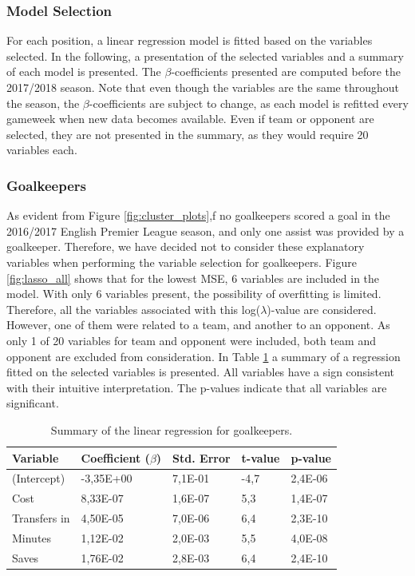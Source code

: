 \subsubsection{Model Selection}
For each position, a linear regression model is fitted based on the variables selected. In the following, a presentation of the selected variables and a summary of each model is presented. The $\beta$-coefficients presented are computed before the 2017/2018 season. Note that even though the variables are the same throughout the season, the $\beta$-coefficients are subject to change, as each model is refitted every gameweek when new data becomes available. Even if team or opponent are selected, they are not presented in the summary, as they would require 20 variables each.

\newpar

\subsubsection{Goalkeepers}

As evident from Figure \ref{fig:cluster_plots},f no goalkeepers scored a goal in the 2016/2017 English Premier League season, and only one assist was provided by a goalkeeper. Therefore, we have decided not to consider these explanatory variables when performing the variable selection for goalkeepers. Figure \ref{fig:lasso_all} shows that for the lowest MSE, 6 variables are included in the model. With only 6 variables present, the possibility of overfitting is limited. Therefore, all the variables associated with this log($\lambda$)-value are considered. However, one of them were related to a team, and another to an opponent. As only 1 of 20 variables for team and opponent were included, both team and opponent are excluded from consideration. In Table \ref{tab:coef_GLK} a summary of a regression fitted on the selected variables is presented. All variables have a sign consistent with their intuitive interpretation. The p-values indicate that all variables are significant. 

\begin{table}[H]
\centering
\begin{tabular}{|l|l|l|l|l|}
\hline
Variable     & Coefficient ($\beta$) & Std. Error & t-value & p-value \\ \hline
(Intercept)  & -3,35E+00    & 7,1E-01    & -4,7    & 2,4E-06               \\
Cost         & 8,33E-07 & 1,6E-07    & 5,3     & 1,4E-07               \\
Transfers in & 4,50E-05 & 7,0E-06    & 6,4     & 2,3E-10               \\
Minutes      & 1,12E-02 & 2,0E-03    & 5,5     & 4,0E-08               \\
Saves        & 1,76E-02 & 2,8E-03    & 6,4     & 2,4E-10
\\
\hline
\end{tabular}
\caption{Summary of the linear regression for goalkeepers.}
\label{tab:coef_GLK}
\end{table}

